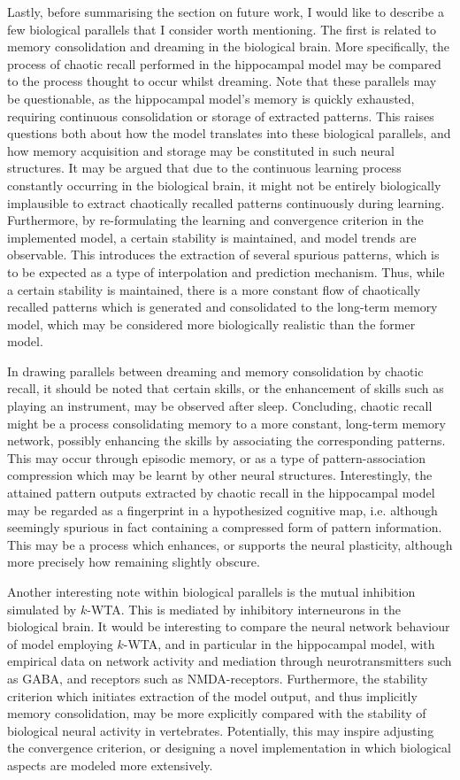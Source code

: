 Lastly, before summarising the section on future work, I would like to describe a few biological parallels that I consider worth mentioning. The first is related to memory consolidation and dreaming in the biological brain. More specifically, the process of chaotic recall performed in the hippocampal model may be compared to the process thought to occur whilst dreaming. Note that these parallels may be questionable, as the hippocampal model's memory is quickly exhausted, requiring continuous consolidation or storage of extracted patterns. This raises questions both about how the model translates into these biological parallels, and how memory acquisition and storage may be constituted in such neural structures.
It may be argued that due to the continuous learning process constantly occurring in the biological brain, it might not be entirely biologically implausible to extract chaotically recalled patterns continuously during learning. Furthermore, by re-formulating the learning and convergence criterion in the implemented model, a certain stability is maintained, and model trends are observable. This introduces the extraction of several spurious patterns, which is to be expected as a type of interpolation and prediction mechanism. Thus, while a certain stability is maintained, there is a more constant flow of chaotically recalled patterns which is generated and consolidated to the long-term memory model, which may be considered more biologically realistic than the former model.

In drawing parallels between dreaming and memory consolidation by chaotic recall, it should be noted that certain skills, or the enhancement of skills such as playing an instrument, may be observed after sleep. Concluding, chaotic recall might be a process consolidating memory to a more constant, long-term memory network, possibly enhancing the skills by associating the corresponding patterns. This may occur through episodic memory, or as a type of pattern-association compression which may be learnt by other neural structures. Interestingly, the attained pattern outputs extracted by chaotic recall in the hippocampal model may be regarded as a fingerprint in a hypothesized cognitive map, i.e. although seemingly spurious in fact containing a compressed form of pattern information.
This may be a process which enhances, or supports the neural plasticity, although more precisely how remaining slightly obscure.

Another interesting note within biological parallels is the mutual inhibition simulated by $k$-WTA. This is mediated by inhibitory interneurons in the biological brain. It would be interesting to compare the neural network behaviour of model employing $k$-WTA, and in particular in the hippocampal model, with empirical data on network activity and mediation through neurotransmitters such as GABA, and receptors such as NMDA-receptors. 
Furthermore, the stability criterion which initiates extraction of the model output, and thus implicitly memory consolidation, may be more explicitly compared with the stability of biological neural activity in vertebrates. Potentially, this may inspire adjusting the convergence criterion, or designing a novel implementation in which biological aspects are modeled more extensively.

